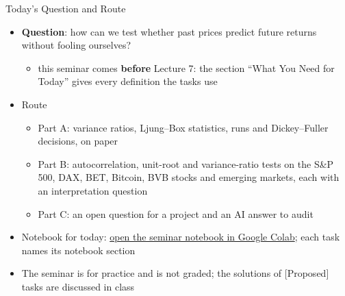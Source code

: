 \begin{frame}{Today's Question and Route}
\itemsize{\small}
\begin{itemize}
    \item \textbf{Question}: how can we test whether past prices predict future returns without fooling ourselves?
    \begin{itemize}
        \item this seminar comes \textbf{before} Lecture 7: the section ``What You Need for Today'' gives every definition the tasks use
    \end{itemize}
    \item Route
    \begin{itemize}
        \item Part A: variance ratios, Ljung--Box statistics, runs and Dickey--Fuller decisions, on paper
        \item Part B: autocorrelation, unit-root and variance-ratio tests on the S\&P 500, DAX, BET, Bitcoin, BVB stocks and emerging markets, each with an interpretation question
        \item Part C: an open question for a project and an AI answer to audit
    \end{itemize}
    \item Notebook for today: \href{\nb}{open the seminar notebook in Google Colab}; each task names its notebook section
    \item The seminar is for practice and is not graded; the solutions of [Proposed] tasks are discussed in class
\end{itemize}
\end{frame}

